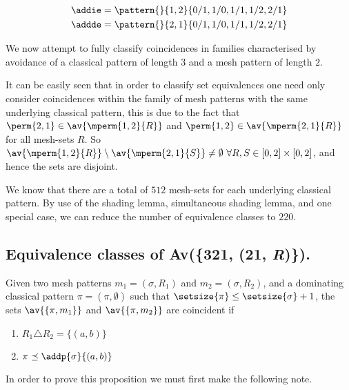 \begin{example}
    \begin{align*}
        \addie = \pattern{}{1,2}{0/1,1/0,1/1,1/2,2/1}\\
        \addde = \pattern{}{2,1}{0/1,1/0,1/1,1/2,2/1}
    \end{align*}
\end{example}

We now attempt to fully classify coincidences in families characterised by avoidance
of a classical pattern of length \(3\) and a mesh pattern of length \(2\).

It can be easily seen that in order to classify set equivalences one need only
consider coincidences within the family of mesh patterns with the same underlying
classical pattern, this is due to the fact that \(\perm{2,1}\in\av{\mperm{1,2}{R}}\)
and \(\perm{1,2}\in\av{\mperm{2,1}{R}}\) for all mesh-sets \(R\). So
\(\av{\mperm{1,2}{R}}\setminus \av{\mperm{2,1}{S}}\neq \emptyset\ \forall
R,S\in [0,2]\times [0,2]\), and hence the sets are disjoint.

We know that there are a total of \(512\) mesh-sets for each underlying classical
pattern. By use of the shading lemma, simultaneous shading lemma, and
one special case, we can reduce the number of equivalence classes to \(220\).

\subsection{Equivalence classes of Av(\{321, (21, \textit{R})\}).}

\begin{proposition}
    \label{prop:dom1}
    Given two mesh patterns \(m_1 =(\sigma, R_1)\) and \(m_2 = (\sigma, R_2)\),
    and a dominating classical pattern \(\pi = (\pi,\emptyset)\) such that
    \(\setsize{\pi} \le \setsize{\sigma} + 1\), the sets \(\av{\{\pi,m_1\}}\) and
    \(\av{\{\pi,m_2\}}\) are coincident if

    \begin{enumerate}
        \item \(R_1 \triangle R_2 = \{(a,b)\}\)
        \item \(\pi \preceq \addp{\sigma}{(a,b)}\)\label{prop:dom1:cont}
    \end{enumerate}
\end{proposition}
In order to prove this proposition we must first make the following note.

